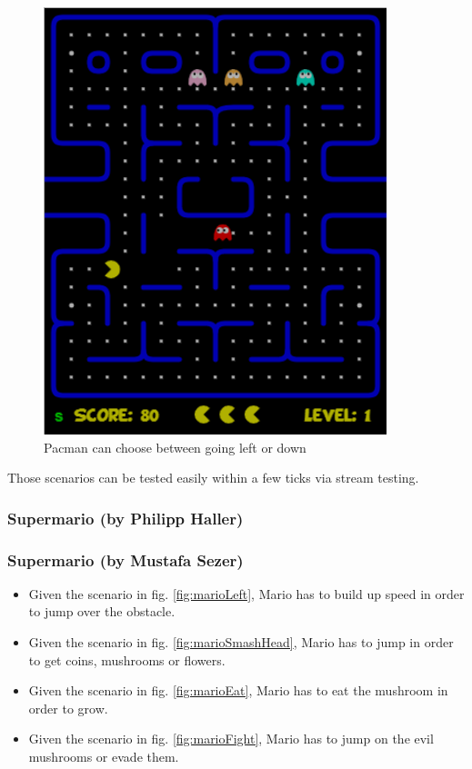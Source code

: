 \begin{figure}[!h]
	\centering
	\includegraphics[scale=0.55]{pictures/Pacman_Condition6.PNG}
	\caption{Pacman can choose between going left or down}
	\label{fig:pacmanCookie}
\end{figure}

Those scenarios can be tested easily within a few ticks via stream testing.

\subsubsection{Supermario (by Philipp Haller)}




\subsubsection{Supermario (by Mustafa Sezer)}

\begin{itemize}
	\item Given the scenario in fig. \ref{fig:marioLeft}, Mario has to build up speed in order to jump over the obstacle.
	\item Given the scenario in fig. \ref{fig:marioSmashHead}, Mario has to jump in order to get coins, mushrooms or flowers.
	\item Given the scenario in fig. \ref{fig:marioEat}, Mario has to eat the mushroom in order to grow.
	\item Given the scenario in fig. \ref{fig:marioFight}, Mario has to jump on the evil mushrooms or evade them.
\end{itemize}

